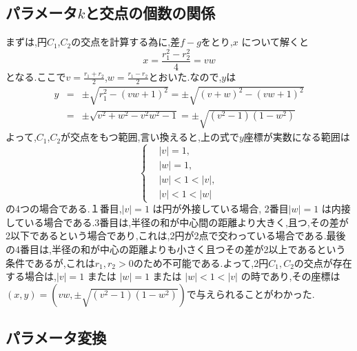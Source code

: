 \documentclass[a4j,12pt]{jarticle}
\numberwithin{equation}{section}
\begin{document}
\subsection{パラメータ$k$と交点の個数の関係}


まずは,円$C_1$,$C_2$の交点を計算する為に,差$f-g$をとり,$x$ について解くと
\begin{equation}
  x =  \frac{r_1^2  - r_2^2}{4} = vw
\end{equation}
となる.ここで$v = \frac{r_1  + r_2}{2}$,$w = \frac{r_1  - r_2}{2}$とおいた.なので,$y$は
\begin{eqnarray}
  y &=& \pm \sqrt{ r_1^2  - (vw + 1)^2 } = \pm \sqrt{ (v+w)^2  - (vw + 1)^2 } \nonumber\\
    &=& \pm \sqrt{ v^2 + w^2  - v^2w^2  -1 }= \pm \sqrt{ (v^2 -1)( 1-w^2 ) }
\end{eqnarray}
よって,$C_1$,$C_2$が交点をもつ範囲,言い換えると,上の式で$y$座標が実数になる範囲は
\begin{equation}
\begin{cases}
  & |v|= 1, \\
  & |w|= 1, \\
  & |w| < 1 < |v|, \\
  &   |v| < 1 < |w|
\end{cases}　
\end{equation}
の4つの場合である.１番目,$|v|=1$ は円が外接している場合, 2番目$|w|=1$ は内接している場合である.3番目は,半径の和が中心間の距離より大きく,且つ,その差が2以下であるという場合であり,これは,2円が2点で交わっている場合である.最後の4番目は,半径の和が中心の距離よりも小さく且つその差が2以上であるという条件であるが,これは$r_1, r_2>0$のため不可能である.よって,2円$C_1,C_2$の交点が存在する場合は,$|v|=1$ または $|w|=1$ または $|w| < 1 < |v|$ の時であり,その座標は$(x,y)=(vw,\pm\sqrt{ (v^2 -1)( 1-w^2 ) })$で与えられることがわかった.\\

\subsection{パラメータ変換}
\end{document}
